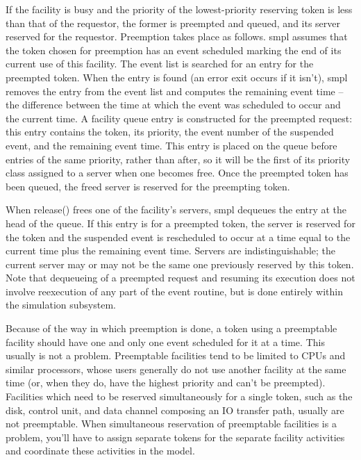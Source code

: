 If the facility is busy and the priority of the lowest-priority reserving token
is less than that of the requestor, the former is preempted and queued, and its
server reserved for the requestor. Preemption takes place as follows. smpl
assumes that the token chosen for preemption has an event scheduled marking
the end of its current use of this facility. The event list is searched for an
entry for the preempted token. When the entry is found (an error exit occurs
if it isn't), smpl removes the entry from the event list and computes the
remaining event time -- the difference between the time at which the event was
scheduled to occur and the current time. A facility queue entry is constructed
for the preempted request: this entry contains the token, its priority, the
event number of the suspended event, and the remaining event time. This entry
is placed on the queue before entries of the same priority, rather than after,
so it will be the first of its priority class assigned to a server when one
becomes free. Once the preempted token has been queued, the freed server is
reserved for the preempting token.

When release() frees one of the facility's servers, smpl dequeues the entry at
the head of the queue. If this entry is for a preempted token, the server is
reserved for the token and the suspended event is rescheduled to occur at a
time equal to the current time plus the remaining event time. Servers are
indistinguishable; the current server may or may not be the same one
previously reserved by this token. Note that dequeueing of a preempted request
and resuming its execution does not involve reexecution of any part of the
event routine, but is done entirely within the simulation subsystem.

Because of the way in which preemption is done, a token using a preemptable
facility should have one and only one event scheduled for it at a time. This
usually is not a problem. Preemptable facilities tend to be limited to CPUs
and similar processors, whose users generally do not use another facility at
the same time (or, when they do, have the highest priority and can't be
preempted). Facilities which need to be reserved simultaneously for a single
token, such as the disk, control unit, and data channel composing an IO
transfer path, usually are not preemptable. When simultaneous reservation of
preemptable facilities is a problem, you'll have to assign separate tokens for
the separate facility activities and coordinate these activities in the model.

